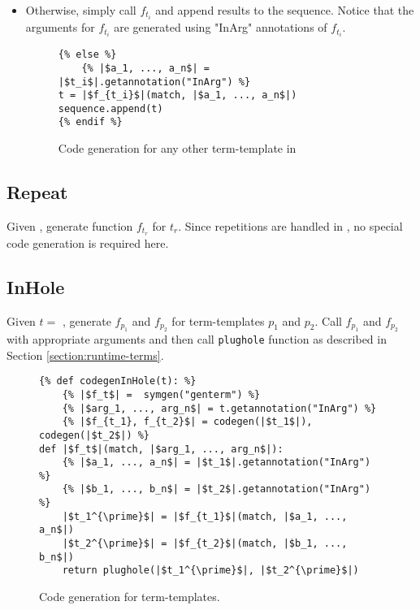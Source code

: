 \begin{itemize}
\item Otherwise, simply call $f_{t_i}$ and append results to the sequence. Notice that the arguments for $f_{t_i}$ are generated using "InArg" annotations of $f_{t_i}$.

\begin{figure}
\begin{verbatim}
{% else %}
	{% |$a_1, ..., a_n$| = |$t_i$|.getannotation("InArg") %}
t = |$f_{t_i}$|(match, |$a_1, ..., a_n$|)
sequence.append(t)
{% endif %}
\end{verbatim}
\caption{Code generation for any other term-template in \TermSequenceNoArg}
\label{codegen-term-sequence-anyother}
\end{figure}
\end{itemize}

\subsection{Repeat}
Given \TermRepeat, generate function $f_{t_r}$ for $t_r$. Since repetitions are handled in \TermSequenceNoArg, no special code generation is required here.

\subsection{InHole}
Given $t=$ \TermInHole, generate $f_{p_1}$ and $f_{p_2}$ for term-templates $p_1$ and $p_2$. Call $f_{p_1}$ and $f_{p_2}$ with appropriate arguments and then call \texttt{plughole} function as described in Section \ref{section:runtime-terms}.

\begin{figure}
\begin{verbatim}
{% def codegenInHole(t): %}
	{% |$f_t$| =  symgen("genterm") %}
	{% |$arg_1, ..., arg_n$| = t.getannotation("InArg") %}
	{% |$f_{t_1}, f_{t_2}$| = codegen(|$t_1$|), codegen(|$t_2$|) %}
def |$f_t$|(match, |$arg_1, ..., arg_n$|):
	{% |$a_1, ..., a_n$| = |$t_1$|.getannotation("InArg") %}
	{% |$b_1, ..., b_n$| = |$t_2$|.getannotation("InArg") %}
	|$t_1^{\prime}$| = |$f_{t_1}$|(match, |$a_1, ..., a_n$|)
	|$t_2^{\prime}$| = |$f_{t_2}$|(match, |$b_1, ..., b_n$|)
	return plughole(|$t_1^{\prime}$|, |$t_2^{\prime}$|)
\end{verbatim}
\caption{Code generation for \PatternInHoleNoArg term-templates.}
\label{codegen-term-inhole}
\end{figure}


